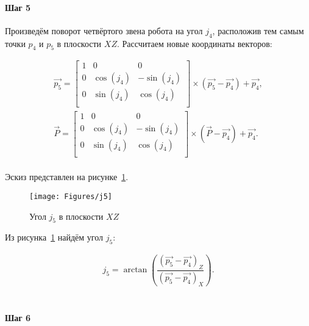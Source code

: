 \paragraph{Шаг 5}

Произведём поворот четвёртого звена робота на угол $j_4$, расположив тем самым точки $p_4$ и $p_5$ в плоскости $XZ$.
Рассчитаем новые координаты векторов:

\begin{gather*}
    \overrightarrow{p_5} =
    \begin{bmatrix}
        1 & 0         & 0          \\
        0 & \cos(j_4) & -\sin(j_4) \\
        0 & \sin(j_4) & \cos(j_4)  \\
    \end{bmatrix} \times \left( \overrightarrow{p_5} - \overrightarrow{p_4} \right) + \overrightarrow{p_4}, \\
    \overrightarrow{P} =
    \begin{bmatrix}
        1 & 0         & 0          \\
        0 & \cos(j_4) & -\sin(j_4) \\
        0 & \sin(j_4) & \cos(j_4)  \\
    \end{bmatrix} \times \left( \overrightarrow{P} - \overrightarrow{p_4} \right) + \overrightarrow{p_4}.
\end{gather*} \\

Эскиз представлен на рисунке~\ref{fig:ikp:j5}.

\begin{figure}[H]
    \centering
    \vspace{14pt}
    \texttt{[image: Figures/j5]}
    \caption{Угол $j_5$ в плоскости $XZ$}
    \label{fig:ikp:j5}
\end{figure}

Из рисунка~\ref{fig:ikp:j5} найдём угол $j_5$:

\begin{gather*}
    j_5 = \arctan \left( \dfrac
    {\left( \overrightarrow{p_5} - \overrightarrow{p_4} \right)_Z}
    {\left( \overrightarrow{p_5} - \overrightarrow{p_4} \right)_X} \right).
\end{gather*} \\

\paragraph{Шаг 6}

